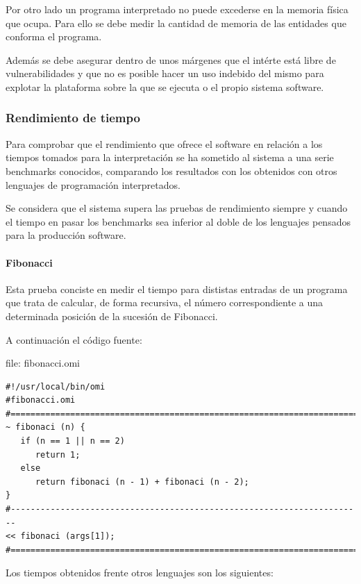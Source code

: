 Por otro lado un programa interpretado no puede excederse en la memoria física que ocupa. Para ello 
se debe medir la cantidad de memoria de las entidades que conforma el programa.

Además se debe asegurar dentro de unos márgenes que el intérte está libre de vulnerabilidades 
y que no es posible hacer un uso indebido del mismo para explotar la plataforma sobre la que se
ejecuta o el propio sistema software.

\subsubsection{Rendimiento de tiempo}
Para comprobar que el rendimiento que ofrece el software en relación a los tiempos tomados para la interpretación 
se ha sometido al sistema a una serie benchmarks conocidos, comparando los resultados con los obtenidos con otros 
lenguajes de programación interpretados.

Se considera que el sistema supera las pruebas de rendimiento siempre y cuando el tiempo en pasar los benchmarks sea inferior al doble de
los lenguajes pensados para la producción software.

\paragraph{Fibonacci}
Esta prueba conciste en medir el tiempo para dististas entradas de un programa que trata de calcular, de forma recursiva, 
el número correspondiente a una determinada posición de la sucesión de Fibonacci. 

A continuación el código fuente:

file: fibonacci.omi
\begin{lstlisting}
#!/usr/local/bin/omi
#fibonacci.omi
#=======================================================================
~ fibonaci (n) {
   if (n == 1 || n == 2) 
      return 1;
   else 
      return fibonaci (n - 1) + fibonaci (n - 2); 
}
#-----------------------------------------------------------------------
<< fibonaci (args[1]);
#=======================================================================
\end{lstlisting}

Los tiempos obtenidos frente otros lenguajes son los siguientes: 

